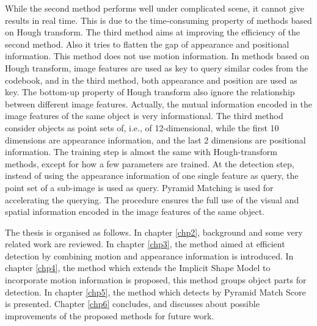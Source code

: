 While the second method performs well under complicated scene, it cannot give results in real time. This is due to the time-consuming property of methods based on Hough transform.   The third method aims at improving the efficiency of the second method. Also it tries to flatten the gap of appearance and positional information. This method does not use motion information. In methods based on Hough transform, image features are used as key to query similar codes from the codebook, and in the third method, both appearance and position are used as key. The bottom-up property of Hough transform also ignore the relationship between different image features. Actually, the mutual information encoded in the image features of the same object is very informational. The third method consider objects as point sets of, i.e., of 12-dimensional, while the first 10 dimensions are appearance information, and the last 2 dimensions are positional information. The training step is almost the same with Hough-transform methods, except for how a few parameters are trained. At the detection step, instead of using the appearance information of one single feature as query, the point set of a sub-image is used as query. Pyramid Matching is used for accelerating the querying. The procedure ensures the full use of the visual and spatial  information encoded in the image features of the same object.

The thesis is organised as follows. In chapter \ref{chp2}, background and some very related work are reviewed. In chapter \ref{chp3}, the method aimed at efficient detection by combining motion and appearance information is introduced. In chapter \ref{chp4}, the method which extends the Implicit Shape Model to incorporate motion information is proposed, this method groups object parts for detection. In chapter \ref{chp5}, the method which detects by Pyramid Match Score is presented. Chapter \ref{chp6} concludes, and discusses about possible improvements of the proposed methods for future work.



